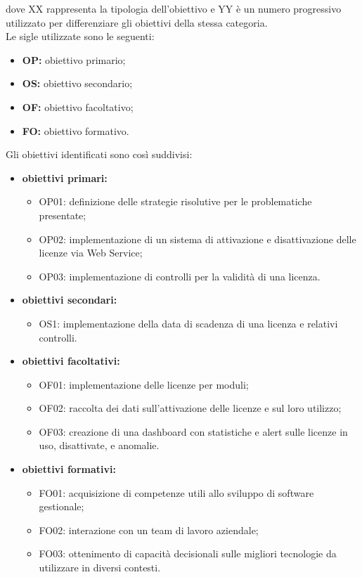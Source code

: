 dove XX rappresenta la tipologia dell'obiettivo e YY è un numero progressivo utilizzato per differenziare gli obiettivi della stessa categoria.
\\
Le sigle utilizzate sono le seguenti:

\begin{itemize}
\item \textbf{OP:} obiettivo primario;
\item \textbf{OS:} obiettivo secondario;
\item \textbf{OF:} obiettivo facoltativo;
\item \textbf{FO:} obiettivo formativo.
\end{itemize}

Gli obiettivi identificati sono così suddivisi:

\begin{itemize}

\item \textbf{obiettivi primari:}\begin{itemize}
\item OP01: definizione delle strategie risolutive per le problematiche presentate;
\item OP02: implementazione di un sistema di attivazione e disattivazione delle licenze via Web Service;
\item OP03: implementazione di controlli per la validità di una licenza.
\end{itemize}
\item \textbf{obiettivi secondari:}\begin{itemize}
\item OS1: implementazione della data di scadenza di una licenza e relativi controlli.
\end{itemize}
\item \textbf{obiettivi facoltativi:}\begin{itemize}
\item OF01: implementazione delle licenze per moduli;
\item OF02: raccolta dei dati sull’attivazione delle licenze e sul loro utilizzo;
\item OF03: creazione di una dashboard con statistiche e alert sulle licenze in uso, disattivate, e anomalie.
\end{itemize}
\item \textbf{obiettivi formativi:}\begin{itemize}
\item FO01: acquisizione di competenze utili allo sviluppo di software gestionale;
\item FO02: interazione con un team di lavoro aziendale;
\item FO03: ottenimento di capacità decisionali sulle migliori tecnologie da utilizzare in diversi contesti.
\end{itemize}

\end{itemize}

